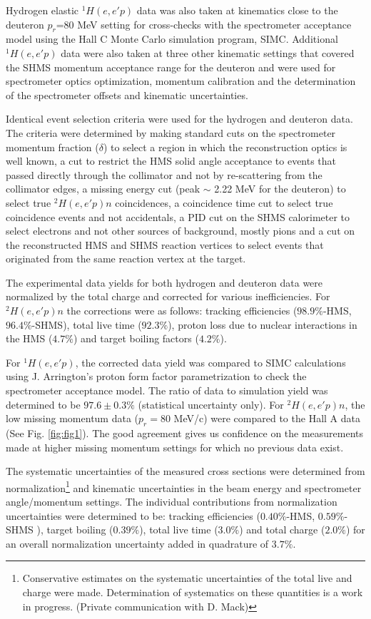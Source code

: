 Hydrogen elastic $^{1}H(e,e'p)$ data was also taken at kinematics close to the deuteron $p_{r}$=80 MeV setting for cross-checks with the spectrometer acceptance model using the  Hall C Monte Carlo
simulation program, SIMC. Additional $^{1}H(e,e'p)$ data were also taken at three other kinematic settings that covered the SHMS momentum acceptance range for the deuteron and were used for spectrometer optics optimization, 
momentum calibration and the determination of the spectrometer offsets and kinematic uncertainties\cite{cyero_specKinUnc,cyero_SHMSOptics}.

Identical event selection criteria were used for the hydrogen and deuteron data. The criteria were determined by making standard cuts on the spectrometer momentum fraction ($\delta$) to select a region in which the reconstruction optics
is well known,  a cut to restrict the HMS solid angle acceptance to events that passed directly through the collimator and not by re-scattering from the collimator edges, a missing
energy cut (peak $\sim$ 2.22 MeV for the deuteron) to select true $^{2}H(e,e'p)n$ coincidences, a coincidence time cut to select true coincidence events and not accidentals,  a PID cut on the
SHMS calorimeter to select electrons and not other sources of background, mostly pions and a cut on the reconstructed HMS and SHMS reaction vertices to select events that 
originated from the same reaction vertex at the target.

The experimental data yields for both hydrogen and deuteron data were normalized by the total charge and corrected for various inefficiencies. For $^{2}H(e,e'p)n$ the corrections were as follows: tracking efficiencies ($98.9 \%$-HMS, $96.4 \%$-SHMS),
total live time ($92.3 \%$), proton loss due to nuclear interactions in the HMS ($4.7 \%$)\cite{cyero_pAbs} and target boiling factors ($4.2 \%$)\cite{cyero_tgtBoil}.

For $^{1}H(e,e'p)$, the corrected data yield was compared to SIMC calculations using J. Arrington's proton form factor parametrization\cite{PhysRevC.69.022201} to check the spectrometer acceptance
model. The ratio of data to simulation yield was determined to be $97.6\pm0.3 \%$ (statistical uncertainty only). For $^{2}H(e,e'p)n$, the low missing momentum data ($p_{r}=80$ MeV/c) were compared to the Hall A data (See Fig. \ref{fig:fig1}).
The good agreement gives us confidence on the measurements made at higher missing momentum settings for which no previous data exist.

The systematic uncertainties of the measured cross sections were determined from 
normalization\footnote{Conservative estimates on the systematic uncertainties of the total live and charge were made.
Determination of systematics on these quantities is a work in progress. (Private communication with D. Mack)} and kinematic uncertainties in the beam energy and spectrometer angle/momentum settings. The individual
contributions from normalization uncertainties were determined to be: tracking efficiencies ($0.40 \%$-HMS, $0.59 \%$-SHMS ), target boiling ($0.39 \%$), total live time ($3.0 \%$) and total charge ($2.0\%$)
for an overall normalization uncertainty added in quadrature of $3.7 \%$. 

